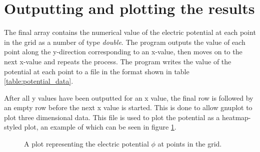 
\section{Outputting and plotting the results} %
The final array contains the numerical value of the electric potential at each point in the grid as a number of type \emph{double}. The program outputs the value of each point along the y-direction corresponding to an x-value, then moves on to the next x-value and repeats the process. The program writes the value of the potential at each point to a file in the format shown in table \ref{table:potential_data}.

After all y values have been outputted for an x value, the final row is followed by an empty row before the next x value is started. This is done to allow gnuplot to plot three dimensional data. This file is used to plot the potential as a heatmap-styled plot, an example of which can be seen in figure \ref{fig:potentialplot}.

\begin{figure}[h!]
\centering
\setlength\fboxsep{0pt}
\setlength\fboxrule{0.5pt}
\label{fig:potentialplot}
\caption{A plot representing the electric potential ${\phi}$ at points in the grid.}
\end{figure}

